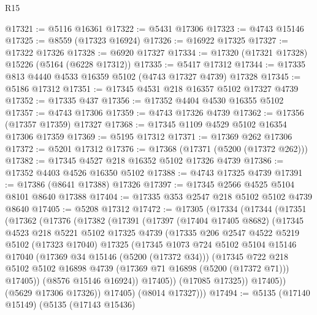 \begin{lexlean}{R15}
\begin{coremodule}
{{{{{{{{{{{@17321 := @5116 @16361
@17322 := @5431 @17306
@17323 := @4743 @15146
@17325 := @8559 (@17323 @16924)
@17326 := @16922 @17325
@17327 := @17322 @17326
@17328 := @6920 @17327
@17334 := @17320 (@17321 @17328) @15226 (@5164 (@6228 @17312))
@17335 := @5417 @17312
@17344 := @17335 @813 @4440 @4533 @16359 @5102 (@4743 @17327 @4739) @17328
@17345 := @5186 @17312
@17351 := @17345 @4531 @218 @16357 @5102 @17327 @4739
@17352 := @17335 @437
@17356 := @17352 @4404 @4530 @16355 @5102
@17357 := @4743 @17306
@17359 := @4743 @17326 @4739
@17362 := @17356 (@17357 @17359) @17327
@17368 := @17345 @1109 @4529 @5102 @16354 @17306 @17359
@17369 := @5195 @17312
@17371 := @17369 @262 @17306
@17372 := @5201 @17312
@17376 := @17368 (@17371 (@5200 (@17372 @262)))
@17382 := @17345 @4527 @218 @16352 @5102 @17326 @4739
@17386 := @17352 @4403 @4526 @16350 @5102
@17388 := @4743 @17325 @4739
@17391 := @17386 (@8641 @17388) @17326
@17397 := @17345 @2566 @4525 @5104 @8101 @8640 @17388
@17404 := @17335 @353 @2547 @218 @5102 @5102 @4739 @8640
@17405 := @5208 @17312
@17472 := @17305
    (@17334
      (@17344
        (@17351
          (@17362
            (@17376
              (@17382
                (@17391
                  (@17397
                    (@17404 @17405 @8682)
                    (@17345
                      @4523
                      @218
                      @5221
                      @5102
                      @17325
                      @4739
                      (@17335
                        @206
                        @2547
                        @4522
                        @5219
                        @5102
                        (@17323 @17040)
                        @17325
                        (@17345
                          @1073
                          @724
                          @5102
                          @5104
                          @15146
                          @17040
                          (@17369 @34 @15146 (@5200 (@17372 @34)))
                          (@17345
                            @722
                            @218
                            @5102
                            @5102
                            @16898
                            @4739
                            (@17369 @71 @16898 (@5200 (@17372 @71)))
                            @17405))
                        (@8576 @15146 @16924))
                      @17405))
                  (@17085 @17325))
                @17405))
            (@5629 @17306 @17326))
          @17405)
        (@8014 @17327)))
@17494 := @5135
    (@17140 @15149)
    (@5135
      (@17143 @15436)
}}}}}}}}}}}
\end{coremodule}
\end{lexlean}

